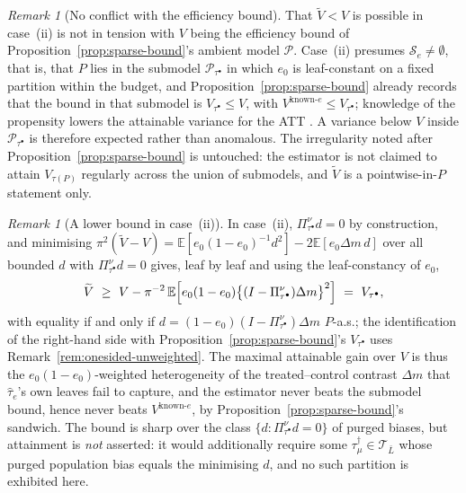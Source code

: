 \documentclass[11pt]{article}
\theoremstyle{plain}
\theoremstyle{definition}
\theoremstyle{remark}
\newtheorem{remark}[theorem]{Remark}
\newcommand{\E}{\mathbb{E}}
\newcommand{\cT}{\mathcal{T}}
\newcommand{\cS}{\mathcal{S}}
\newcommand{\cP}{\mathcal{P}}
\newcommand{\ez}{e_0}
\newcommand{\that}{\widehat{\tau}}
\newcommand{\Vtil}{\widetilde{V}}
\begin{document}
\begin{remark}[No conflict with the efficiency bound]\label{rem:onesided-hahn}
That $\Vtil<V$ is possible in case~(ii) is not in tension with $V$ being the
efficiency bound of Proposition~\ref{prop:sparse-bound}'s ambient model $\cP$.
Case~(ii) presumes $\cS_e\ne\emptyset$, that is, that $P$ lies in the submodel
$\cP_{\tau^\bullet}$ in which $\ez$ is leaf-constant on a fixed partition within
the budget, and Proposition~\ref{prop:sparse-bound} already records that the
bound in that submodel is $V_{\tau^\bullet}\le V$, with
$V^{\mathrm{known}\text{-}e}\le V_{\tau^\bullet}$; knowledge of the propensity
lowers the attainable variance for the ATT \citep{hahn1998}. A variance below
$V$ inside $\cP_{\tau^\bullet}$ is therefore expected rather than anomalous. The
irregularity noted after Proposition~\ref{prop:sparse-bound} is untouched: the
estimator is not claimed to attain $V_{\tau(P)}$ regularly across the union of
submodels, and $\Vtil$ is a pointwise-in-$P$ statement only.
\end{remark}

\begin{remark}[A lower bound in case~(ii)]\label{rem:onesided-bound}
In case~(ii), $\Pi^\nu_{\tau^\bullet}d=0$ by construction, and minimising
$\pi^2(\Vtil-V)=\E[\ez(1-\ez)^{-1}d^2]-2\E[\ez\Delta m\,d]$ over all bounded $d$
with $\Pi^\nu_{\tau^\bullet}d=0$ gives, leaf by leaf and using the
leaf-constancy of $\ez$,
\[
  \Vtil\ \ge\ V-\pi^{-2}\,\E\Bigl[\ez(1-\ez)
   \bigl\{(I-\Pi^\nu_{\tau^\bullet})\Delta m\bigr\}^2\Bigr]
  \ =\ V_{\tau^\bullet},
\]
with equality if and only if $d=(1-\ez)(I-\Pi^\nu_{\tau^\bullet})\Delta m$
$P$-a.s.; the identification of the right-hand side with
Proposition~\ref{prop:sparse-bound}'s $V_{\tau^\bullet}$ uses
Remark~\ref{rem:onesided-unweighted}. The maximal attainable gain over $V$ is
thus the $\ez(1-\ez)$-weighted heterogeneity of the treated--control contrast
$\Delta m$ that $\that_e$'s own leaves fail to capture, and the estimator never
beats the submodel bound, hence never beats $V^{\mathrm{known}\text{-}e}$, by
Proposition~\ref{prop:sparse-bound}'s sandwich. The bound is sharp over the
class $\{d:\Pi^\nu_{\tau^\bullet}d=0\}$ of purged biases, but attainment is
\emph{not} asserted: it would additionally require some
$\tau^\dagger_\mu\in\cT_{\bar L}$ whose purged population bias equals the
minimising $d$, and no such partition is exhibited here.
\end{remark}
\end{document}
